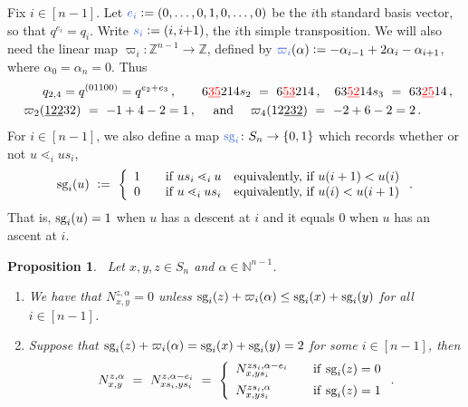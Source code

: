 \documentclass[12pt,oneside,reqno]{amsart}
\newtheorem{proposition}[theorem]{Proposition}
\theoremstyle{definition}
\numberwithin{equation}{section}
\newcommand{\NN}{{\mathbb N}}
\newcommand{\ZZ}{{\mathbb Z}}
\newcommand{\sg}{{\mbox{\rm sg}}}
\newcommand{\defcolor}[1]{{\color{RoyalBlue}#1}}
\begin{document}
Fix $i\in[n{-}1]$.
Let $\defcolor{e_i}\vcentcolon=(0,\dotsc,0,1,0,\dotsc,0)$ be the $i$th standard basis vector, so that $q^{e_i}=q_i$.
Write $\defcolor{s_i}\vcentcolon=(i,i{+}1)$, the $i$th simple transposition.
We will also need the linear map $\varpi_i\colon\ZZ^{n-1}\to\ZZ$, defined by
$\defcolor{\varpi_i}(\alpha)\vcentcolon=-\alpha_{i-1}+2\alpha_i-\alpha_{i+1}$, where $\alpha_0=\alpha_n=0$.   
Thus
%
 \begin{multline*}
   \qquad  q_{2,4}=q^{(01100)}=q^{e_2+e_3}\,,   \qquad
   6{\color{red}\underline{35}}214 s_2\ =\ 6{\color{red}\underline{53}}214\,,\quad
   63{\color{red}\underline{52}}14 s_3\ =\ 63{\color{red}\underline{25}}14\,, \\
   \varpi_2(\underline{122}32)\ =\ -1+4-2=1\,,\quad \mbox{ and }\quad  \varpi_4(12\underline{232})\ =\ -2+6-2=2\,.\qquad 
 \end{multline*}
 For $i\in[n{-}1]$, we also define a map $\defcolor{\sg_i}\colon S_n\to\{0,1\}$ which records whether or not $u\lessdot_i
 us_i$, 
 \[
    \sg_i(u)\ \vcentcolon=\ \left\{ \begin{array}{rcl}
       1& &\mbox{if\ } u s_i\lessdot_i  u     \quad\mbox{equivalently, if\ } u(i+1)<u(i)
      \\
       0& &\mbox{if\ } u    \lessdot_i  u s_i \quad\mbox{equivalently, if\ } u(i)<u(i+1)
    \end{array}\right. .
 \]                 
 That is, $\sg_i(u)=1$ when $u$ has a descent at $i$ and it equals $0$ when $u$ has an ascent at $i$. 
  
\begin{proposition}~\cite[Theorem 1.1]{LeungLi2012}\label{P:LL_Th1.1}
  Let $x,y,z\in S_n$ and $\alpha\in\NN^{n-1}$. 
  \begin{enumerate}
    \item We have that $N^{z, \alpha}_{x,y}=0$ unless
           $\sg_i(z)+\varpi_i(\alpha) \leq \sg_i(x)+\sg_i(y)$ for all $i\in[n{-}1]$.\vspace{2pt}
           
    \item Suppose that   $\sg_i(z)+\varpi_i(\alpha) = \sg_i(x)+\sg_i(y)=2$ for some $i\in[n{-}1]$, then
  \[
           N^{z,\alpha}_{x,y}\ =\ N^{z,\alpha-e_i}_{x s_i, y s_i}\ =\ \left\{ \begin{array}{lcl}
                 N^{z s_i, \alpha-e_i}_{x, ys_i}& &\mbox{if\/\ } \sg_i(z)=0\vspace{5pt}\\
                 N^{z s_i, \alpha}_{x, ys_i}&  &\mbox{if\/\ } \sg_i(z)=1\end{array}\right. .
 \]
 \end{enumerate}
\end{proposition}
\end{document}

